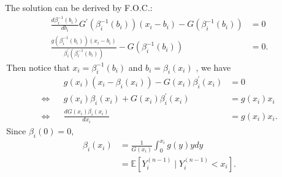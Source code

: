 The solution can be derived by F.O.C.: $$\begin{aligned}
\frac{d \beta_{i}^{-1}\left(b_{i}\right)}{d b_{i}} G^{\prime}\left(\beta_{i}^{-1}\left(b_{i}\right)\right)\left(x_{i}-b_{i}\right)-G\left(\beta_{i}^{-1}\left(b_{i}\right)\right)&=0 \\
\frac{g\left(\beta_{i}^{-1}\left(b_{i}\right)\right)\left(x_{i}-b_{i}\right)}{\beta_{i}^{\prime}\left(\beta_{i}^{-1}\left(b_{i}\right)\right)}-G\left(\beta_{i}^{-1}\left(b_{i}\right)\right)&=0.
\end{aligned}$$
\,Then notice that  $x_{i}=\beta_{i}^{-1}\left(b_{i}\right)$  and  $b_{i}=\beta_{i}\left(x_{i}\right)$ , we have
$$\begin{aligned}
&&g\left(x_{i}\right)\left(x_{i}-\beta_{i}\left(x_{i}\right)\right)-G\left(x_{i}\right) \beta_{i}^{\prime}\left(x_{i}\right)&=0 \\
\iff&& g\left(x_{i}\right) \beta_{i}\left(x_{i}\right)+G\left(x_{i}\right) \beta_{i}^{\prime}\left(x_{i}\right)&=g\left(x_{i}\right) x_{i} \\
\iff&&  \frac{d G\left(x_{i}\right) \beta_{i}\left(x_{i}\right)}{d x_{i}}&=g\left(x_{i}\right) x_{i}.
\end{aligned}$$
\,Since  $\beta_{i}(0)=0$,
\begin{equation}\label{equ:FPAstrategy}
\begin{aligned}
\beta_{i}\left(x_{i}\right) & =\frac{1}{G\left(x_{i}\right)} \int_{0}^{x_{i}} g(y) y d y \\
& =\mathbb{E}\left[Y_{i}^{(n-1)} \mid Y_{i}^{(n-1)}<x_{i}\right].
\end{aligned}
\end{equation}

